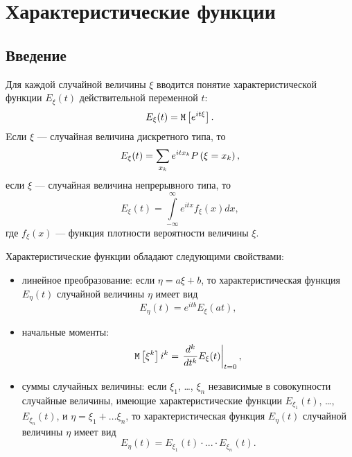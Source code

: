 \chapter{Характеристические функции}

\section*{Введение}

Для каждой случайной величины $\xi$ вводится понятие характеристической функции $E_\xi(t)$ действительной переменной $t$:
\begin{equation}
    E_\xi(t) = \mathtt{M} \left [ e^{i t \xi} \right ].
\end{equation}
Eсли $\xi$ --- случайная величина дискретного типа, то
\begin{equation}
    E_\xi(t) = \sum_{x_k} e^{i t x_k} P \left ( \xi = x_k \right ),
\end{equation}
если $\xi$ --- случайная величина непрерывного типа, то
\begin{equation}
    E_\xi(t) = \int \limits_{-\infty}^\infty e^{i t x} f_\xi(x) dx,
\end{equation}
где $f_\xi(x)$ --- функция плотности вероятности величины $\xi$.

Характеристические функции обладают следующими свойствами:
\begin{itemize}
    \item линейное преобразование: если $\eta = a \xi + b$, то характеристическая функция $E_\eta(t)$ случайной величины $\eta$ имеет вид
    \begin{equation}
        E_\eta(t) = e^{i t b} E_\xi(a t),
    \end{equation}
    \item начальные моменты:
    \begin{equation}
        \mathtt{M} \left [ \xi^k \right ] i^k = \left . \frac{d^{k}}{d{t}^{k}} E_\xi(t) \right |_{t=0} ,
    \end{equation}
    \item суммы случайных величины: если $\xi_1$, \dots, $\xi_n$ независимые в совокупности случайные величины, имеющие характеристические функции $E_{\xi_1}(t)$, \dots,
    $E_{\xi_n}(t)$, и $\eta = \xi_1 + \dots \xi_n$, то характеристическая функция $E_\eta(t)$ случайной величины $\eta$ имеет вид
    \begin{equation}
        E_\eta(t) = E_{\xi_1}(t) \cdot ... \cdot E_{\xi_n}(t) .
    \end{equation}
\end{itemize}

